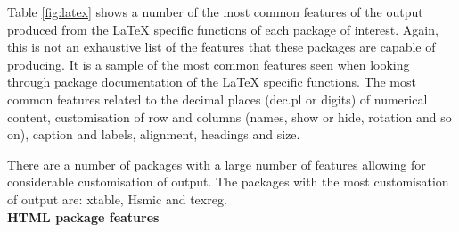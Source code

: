 \documentclass{memoir}\usepackage[]{graphicx}\usepackage[]{color}
\newcommand{\pkg}[1]{{\fontseries{b}\selectfont #1}}
\newcommand{\latex}{\LaTeX\xspace}
\begin{document}
Table \ref{fig:latex} shows a number of the most common features of the output produced from the \latex specific functions of each package of interest. Again, this is not an exhaustive list of the features that these packages are capable of producing. It is a sample of the most common features seen when looking through package documentation of the \latex specific functions. The most common features related to the decimal places (dec.pl or digits) of numerical content, customisation of row and columns (names, show or hide, rotation and so on),  caption and labels, alignment, headings and size. 

There are a number of packages with a large number of features allowing for considerable customisation of output. The packages with the most customisation of output are: \pkg{xtable}, \pkg{Hsmic} and \pkg{texreg}.\\


\textbf{HTML package features}
\end{document}
